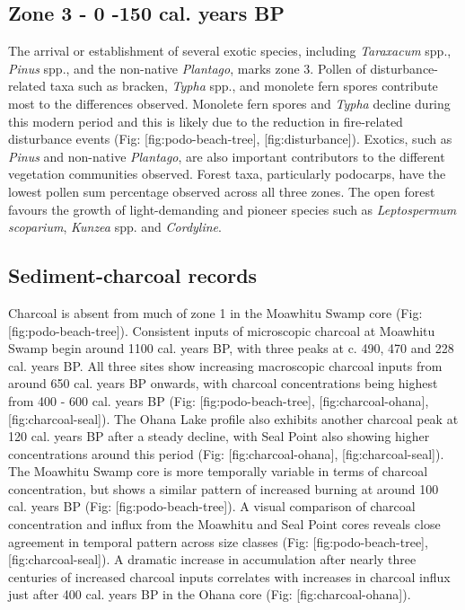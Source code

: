 \subsection{Zone 3 - 0 -150 cal. years
BP}\label{zone-3---0--150-cal.-years-bp}

The arrival or establishment of several exotic species, including
\emph{Taraxacum} spp., \emph{Pinus} spp., and the non-native
\emph{Plantago}, marks zone 3. Pollen of disturbance-related taxa such
as bracken, \emph{Typha} spp., and monolete fern spores contribute most
to the differences observed. Monolete fern spores and \emph{Typha}
decline during this modern period and this is likely due to the
reduction in fire-related disturbance events (Fig:
{[}fig:podo-beach-tree{]}, {[}fig:disturbance{]}). Exotics, such as
\emph{Pinus} and non-native \emph{Plantago}, are also important
contributors to the different vegetation communities observed. Forest
taxa, particularly podocarps, have the lowest pollen sum percentage
observed across all three zones. The open forest favours the growth of
light-demanding and pioneer species such as \emph{Leptospermum
scoparium}, \emph{Kunzea} spp. and \emph{Cordyline}.

\subsection{Sediment-charcoal records}\label{sediment-charcoal-records}

Charcoal is absent from much of zone 1 in the Moawhitu Swamp core (Fig:
{[}fig:podo-beach-tree{]}). Consistent inputs of microscopic charcoal at
Moawhitu Swamp begin around 1100 cal. years BP, with three peaks at c.
490, 470 and 228 cal. years BP. All three sites show increasing
macroscopic charcoal inputs from around 650 cal. years BP onwards, with
charcoal concentrations being highest from 400 - 600 cal. years BP (Fig:
{[}fig:podo-beach-tree{]}, {[}fig:charcoal-ohana{]},
{[}fig:charcoal-seal{]}). The Ohana Lake profile also exhibits another
charcoal peak at 120 cal. years BP after a steady decline, with Seal
Point also showing higher concentrations around this period (Fig:
{[}fig:charcoal-ohana{]}, {[}fig:charcoal-seal{]}). The Moawhitu Swamp
core is more temporally variable in terms of charcoal concentration, but
shows a similar pattern of increased burning at around 100 cal. years BP
(Fig: {[}fig:podo-beach-tree{]}). A visual comparison of charcoal
concentration and influx from the Moawhitu and Seal Point cores reveals
close agreement in temporal pattern across size classes (Fig:
{[}fig:podo-beach-tree{]}, {[}fig:charcoal-seal{]}). A dramatic increase
in accumulation after nearly three centuries of increased charcoal
inputs correlates with increases in charcoal influx just after 400 cal.
years BP in the Ohana core (Fig: {[}fig:charcoal-ohana{]}).


